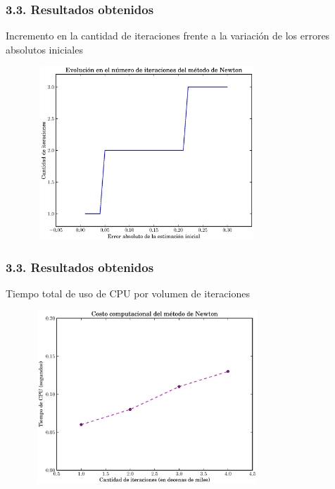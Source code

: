 \documentclass{beamer}
\begin{document}

\begin{frame}
\frametitle{3.3. Resultados obtenidos}
\begin{block}{Incremento en la cantidad de iteraciones frente a la variación de 
los errores absolutos iniciales}

\begin{figure}[!th]
\begin{center}\includegraphics[height=6.5cm, width=8.5cm]{images/iterevol.eps}
\label{iter}
\end{center}
\end{figure}

\end{block}
\end{frame} 


\begin{frame}
\frametitle{3.3. Resultados obtenidos}
\begin{block}{Tiempo total de uso de CPU por volumen de iteraciones}

\begin{figure}[!th]
\begin{center}\includegraphics[height=6.5cm, width=8.5cm]{images/CPUtime.eps}
\label{iter}
\end{center}
\end{figure}

\end{block}
\end{frame} 
\end{document}
